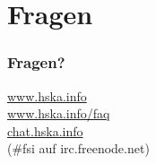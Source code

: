 \documentclass[final]{beamer}
\begin{document}
\section{Fragen}
\begin{frame}
\frametitle{Fragen?}
\begin{center}
\url{www.hska.info}\\
\url{www.hska.info/faq}\\
\vspace{.5cm}
\url{chat.hska.info}\\
(\#fsi auf irc.freenode.net)
\end{center}
\end{frame}
\end{document}
